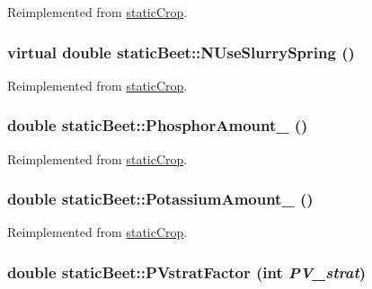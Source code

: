 Reimplemented from \hyperlink{classstatic_crop_a6b89d7839db435c7ceafa2755312182e}{staticCrop}.\hypertarget{classstatic_beet_a9a9f897edecad06aaa42d1f1875fd111}{
\subsubsection[{NUseSlurrySpring}]{\setlength{\rightskip}{0pt plus 5cm}virtual double staticBeet::NUseSlurrySpring ()}}
\label{classstatic_beet_a9a9f897edecad06aaa42d1f1875fd111}


Reimplemented from \hyperlink{classstatic_crop_ae7d21ab4afc8d8355d231566e8d87b1b}{staticCrop}.\hypertarget{classstatic_beet_afe8f6891ceee71739788e01393a13bec}{
\subsubsection[{PhosphorAmount\_\-}]{\setlength{\rightskip}{0pt plus 5cm}double staticBeet::PhosphorAmount\_\- ()}}
\label{classstatic_beet_afe8f6891ceee71739788e01393a13bec}


Reimplemented from \hyperlink{classstatic_crop_abaa5c59d4074d47dedc79172f8326e08}{staticCrop}.\hypertarget{classstatic_beet_a4f19a0d8935d02ca200825d92df403d9}{
\subsubsection[{PotassiumAmount\_\-}]{\setlength{\rightskip}{0pt plus 5cm}double staticBeet::PotassiumAmount\_\- ()}}
\label{classstatic_beet_a4f19a0d8935d02ca200825d92df403d9}


Reimplemented from \hyperlink{classstatic_crop_a41fee98d728c7670e6acb504a9b3459d}{staticCrop}.\hypertarget{classstatic_beet_a70822a52271755f931ac0ae449e1f339}{
\subsubsection[{PVstratFactor}]{\setlength{\rightskip}{0pt plus 5cm}double staticBeet::PVstratFactor (int {\em PV\_\-strat})}}
\label{classstatic_beet_a70822a52271755f931ac0ae449e1f339}


